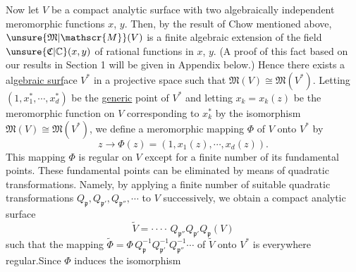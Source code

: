 Now let $V$ be a compact analytic surface with two algebraically independent meromorphic functions $x$, $y$. Then, by the result of Chow mentioned above, $\unsure{\mathfrak{M}|\mathscr{M}}(V)$ is a finite algebraic extension of the field $\unsure{\mathfrak{C}|\mathbb{C}}(x,y)$ of rational functions in $x$, $y$. (A proof of this fact based on our results in Section 1 will be given in Appendix below.) Hence there exists a  al\uline{gebraic surf}ace $V^{*}$ in a projective space such that $\mathfrak{M}(V)\cong\mathfrak{M}(V^{*})$. Letting $(1,x_{1}^{*},\cdots,x_{d}^{*})$ be the \uline{generic} point of $V^{*}$ and letting $x_{k}=x_{k}(z)$ be the meromorphic function on $V$ corresponding to $x_{k}^{*}$ by the isomorphism $\mathfrak{M}(V)\cong\mathfrak{M}(V^{*})$, we define a meromorphic mapping $\Phi$ of $V$ onto $V^{*}$ by
\[
z\longrightarrow\Phi(z)=(1,x_{1}(z),\cdots,x_{d}(z)).
\]
This mapping $\Phi$ is regular on $V$ except for a finite number of its fundamental points. These fundamental points can be eliminated by means of quadratic transformations. Namely, by applying a finite number of suitable quadratic transformations $Q_{\mathfrak{p}}, Q_{\mathfrak{p}'}, Q_{\mathfrak{p}''},\cdots$ to $V$ successively, we obtain a compact analytic surface
\[
\widetilde{V}=\cdot\cdot\cdot\cdot\, Q_{\mathfrak{p}''}Q_{\mathfrak{p}'}Q_{\mathfrak{p}}(V)
\]
such that the mapping $\widetilde{\Phi}=\Phi\,Q_{\mathfrak{p}}^{-1}Q_{\mathfrak{p}'}^{-1}Q_{\mathfrak{p}''}^{-1}\cdots$ of $\widetilde{V}$ onto $V^{*}$ is everywhere regular.\footnotemark[7] Since $\Phi$ induces the isomorphism
